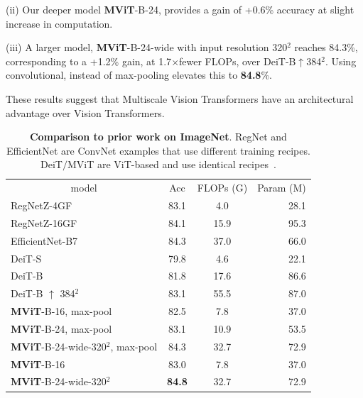 \documentclass[10pt,twocolumn,letterpaper]{article}
\def\x{$\times$}
\newcommand{\tablestyle}[2]{\setlength{\tabcolsep}{#1}\renewcommand{\arraystretch}{#2}\centering\footnotesize}
\begin{document}
(ii) Our deeper model \textbf{MViT}-B-24, provides a gain of {+0.6}\% accuracy at slight increase in computation. 

(iii) A  larger model, \textbf{MViT}-B-24-wide with input resolution 320$^2$ reaches 84.3\%, corresponding to a +1.2\% gain, at 1.7\x fewer FLOPs, over DeiT-B$\uparrow$384$^2$. Using convolutional, instead of max-pooling elevates this to  \textbf{84.8}\%.

These results suggest that Multiscale Vision Transformers have an architectural advantage over Vision Transformers.  

\begin{table}[t!]
	\centering
	\tablestyle{1.8pt}{1.05}
	\begin{tabular}{l|c|c|r}
		\multicolumn{1}{c|}{model}  &  Acc  & FLOPs (G)   & Param (M) \\
		\shline		
		\hline
		{RegNetZ-4GF \cite{dollar2021fast} }  &   83.1 & 4.0 &  28.1 \\ 
		{RegNetZ-16GF \cite{dollar2021fast} }  &   84.1 & 15.9 &  95.3 \\
		{EfficientNet-B7 \cite{tan2019efficientnet}}  &  84.3 & 37.0 & 66.0 \\
		\hline
		DeiT-S \cite{touvron2020training} &     79.8 & 4.6 & 22.1 \\
		DeiT-B \cite{touvron2020training} &     81.8 & 17.6 & 86.6 \\
		DeiT-B $\uparrow$ 384$^{2}$ \cite{touvron2020training} & 83.1 &  55.5 &   87.0 \\

		\shline

		\textbf{MViT}-B-16, max-pool &     82.5 & 7.8 & 37.0 \\
		\textbf{MViT}-B-24, max-pool &     83.1 & 10.9 & 53.5 \\
		\textbf{MViT}-B-24-wide-320$^{2}$, max-pool &  84.3  & 32.7 & 72.9 \\ 
		
		\hline	
		\textbf{MViT}-B-16 &     83.0 & 7.8 & 37.0 \\
		\textbf{MViT}-B-24-wide-320$^{2}$ &  \textbf{84.8}  &  32.7 & 72.9 \\ 
		
	\end{tabular}%
	\vspace{3pt}
	\caption{\textbf{Comparison to prior work on ImageNet}. \mbox{RegNet} and EfficientNet are ConvNet examples that use different training recipes. DeiT$/$MViT are ViT-based and use identical recipes~\cite{touvron2020training}.  
	}
	\label{tab:sota:in1k}
	\vspace{-1.0em}
\end{table}
\end{document}
